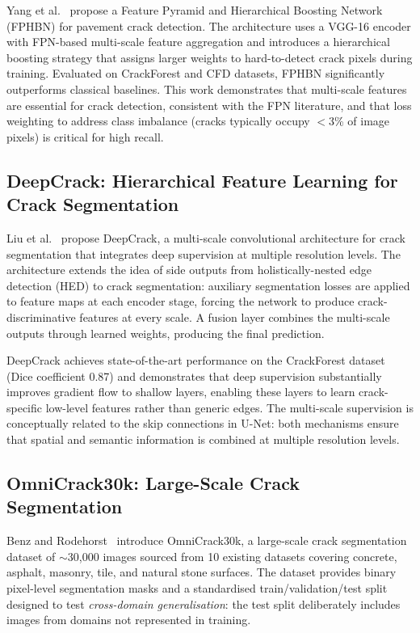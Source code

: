 \documentclass[12pt,a4paper]{article}
\begin{document}
Yang et al.~\cite{surv:yang2019fphb} propose a Feature Pyramid and Hierarchical Boosting Network (FPHBN) for pavement crack detection. The architecture uses a VGG-16 encoder with FPN-based multi-scale feature aggregation and introduces a hierarchical boosting strategy that assigns larger weights to hard-to-detect crack pixels during training. Evaluated on CrackForest and CFD datasets, FPHBN significantly outperforms classical baselines. This work demonstrates that multi-scale features are essential for crack detection, consistent with the FPN literature, and that loss weighting to address class imbalance (cracks typically occupy $<$3\% of image pixels) is critical for high recall.

\subsection{DeepCrack: Hierarchical Feature Learning for Crack Segmentation}

Liu et al.~\cite{surv:liu2019deepcrack} propose DeepCrack, a multi-scale convolutional architecture for crack segmentation that integrates deep supervision at multiple resolution levels. The architecture extends the idea of side outputs from holistically-nested edge detection (HED) to crack segmentation: auxiliary segmentation losses are applied to feature maps at each encoder stage, forcing the network to produce crack-discriminative features at every scale. A fusion layer combines the multi-scale outputs through learned weights, producing the final prediction.

DeepCrack achieves state-of-the-art performance on the CrackForest dataset (Dice coefficient 0.87) and demonstrates that deep supervision substantially improves gradient flow to shallow layers, enabling these layers to learn crack-specific low-level features rather than generic edges. The multi-scale supervision is conceptually related to the skip connections in U-Net: both mechanisms ensure that spatial and semantic information is combined at multiple resolution levels.

\subsection{OmniCrack30k: Large-Scale Crack Segmentation}

Benz and Rodehorst~\cite{surv:benz2022omnicrack} introduce OmniCrack30k, a large-scale crack segmentation dataset of $\sim$30{,}000 images sourced from 10 existing datasets covering concrete, asphalt, masonry, tile, and natural stone surfaces. The dataset provides binary pixel-level segmentation masks and a standardised train/validation/test split designed to test \textit{cross-domain generalisation}: the test split deliberately includes images from domains not represented in training.
\end{document}
